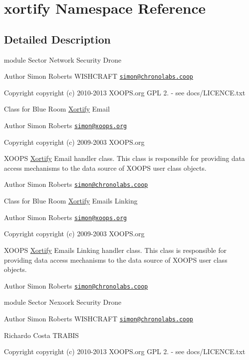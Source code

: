 \hypertarget{namespacexortify}{\section{xortify Namespace Reference}
\label{namespacexortify}
}


\subsection{Detailed Description}
module  Sector Network Security Drone \begin{DoxyAuthor}{Author}
Simon Roberts W\-I\-S\-H\-C\-R\-A\-F\-T \href{mailto:simon@chronolabs.coop}{\tt simon@chronolabs.\-coop} 
\end{DoxyAuthor}
\begin{DoxyCopyright}{Copyright}
copyright (c) 2010-\/2013 X\-O\-O\-P\-S.\-org  G\-P\-L 2. -\/ see docs/\-L\-I\-C\-E\-N\-C\-E.\-txt
\end{DoxyCopyright}
Class for Blue Room \hyperlink{namespace_xortify}{Xortify} Email \begin{DoxyAuthor}{Author}
Simon Roberts \href{mailto:simon@xoops.org}{\tt simon@xoops.\-org} 
\end{DoxyAuthor}
\begin{DoxyCopyright}{Copyright}
copyright (c) 2009-\/2003 X\-O\-O\-P\-S.\-org
\end{DoxyCopyright}
X\-O\-O\-P\-S \hyperlink{namespace_xortify}{Xortify} Email handler class. This class is responsible for providing data access mechanisms to the data source of X\-O\-O\-P\-S user class objects.

\begin{DoxyAuthor}{Author}
Simon Roberts \href{mailto:simon@chronolabs.coop}{\tt simon@chronolabs.\-coop}
\end{DoxyAuthor}
Class for Blue Room \hyperlink{namespace_xortify}{Xortify} Emails Linking \begin{DoxyAuthor}{Author}
Simon Roberts \href{mailto:simon@xoops.org}{\tt simon@xoops.\-org} 
\end{DoxyAuthor}
\begin{DoxyCopyright}{Copyright}
copyright (c) 2009-\/2003 X\-O\-O\-P\-S.\-org
\end{DoxyCopyright}
X\-O\-O\-P\-S \hyperlink{namespace_xortify}{Xortify} Emails Linking handler class. This class is responsible for providing data access mechanisms to the data source of X\-O\-O\-P\-S user class objects.

\begin{DoxyAuthor}{Author}
Simon Roberts \href{mailto:simon@chronolabs.coop}{\tt simon@chronolabs.\-coop}
\end{DoxyAuthor}
module  Sector Nexoork Security Drone \begin{DoxyAuthor}{Author}
Simon Roberts W\-I\-S\-H\-C\-R\-A\-F\-T \href{mailto:simon@chronolabs.coop}{\tt simon@chronolabs.\-coop} 

Richardo Costa T\-R\-A\-B\-I\-S 
\end{DoxyAuthor}
\begin{DoxyCopyright}{Copyright}
copyright (c) 2010-\/2013 X\-O\-O\-P\-S.\-org  G\-P\-L 2. -\/ see docs/\-L\-I\-C\-E\-N\-C\-E.\-txt 
\end{DoxyCopyright}
